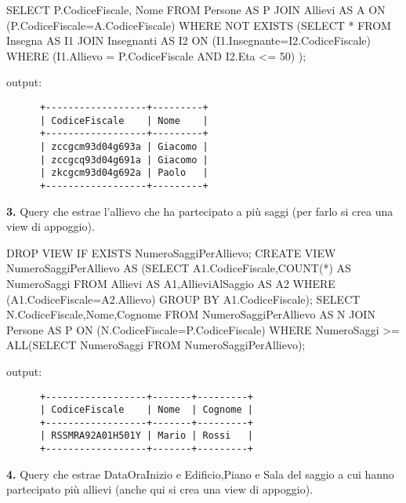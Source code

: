 \documentclass{article}
\begin{document}
\begin{sql}[float=h]
SELECT P.CodiceFiscale, Nome 
FROM Persone AS P JOIN Allievi AS A ON (P.CodiceFiscale=A.CodiceFiscale) 
WHERE NOT EXISTS (SELECT * FROM Insegna AS I1 JOIN Insegnanti AS I2 ON (I1.Insegnante=I2.CodiceFiscale)
		  WHERE (I1.Allievo = P.CodiceFiscale AND I2.Eta <= 50)				
		 );
\end{sql}

\begin{flushleft}
output:
\end{flushleft}

\begin{verbatim}
      +------------------+---------+
      | CodiceFiscale    | Nome    |
      +------------------+---------+
      | zccgcm93d04g693a | Giacomo |
      | zccgcq93d04g691a | Giacomo |
      | zkcgcm93d04g692a | Paolo   |
      +------------------+---------+
\end{verbatim}

\newpage

\begin{flushleft}
\textbf{3.} Query che estrae l'allievo che ha partecipato a più saggi (per farlo si crea una view di appoggio).
\end{flushleft}

\begin{sql}[float=h]
DROP VIEW IF EXISTS NumeroSaggiPerAllievo;
CREATE VIEW NumeroSaggiPerAllievo AS (SELECT A1.CodiceFiscale,COUNT(*) AS NumeroSaggi
				      FROM Allievi AS A1,AllieviAlSaggio AS A2
				      WHERE (A1.CodiceFiscale=A2.Allievo)
				      GROUP BY A1.CodiceFiscale);
SELECT N.CodiceFiscale,Nome,Cognome 
FROM NumeroSaggiPerAllievo AS N JOIN Persone AS P ON (N.CodiceFiscale=P.CodiceFiscale)
WHERE NumeroSaggi >= ALL(SELECT NumeroSaggi FROM NumeroSaggiPerAllievo); 
\end{sql}

\begin{flushleft}
output:
\end{flushleft}

\begin{verbatim}
      +------------------+-------+---------+
      | CodiceFiscale    | Nome  | Cognome |
      +------------------+-------+---------+
      | RSSMRA92A01H501Y | Mario | Rossi   |
      +------------------+-------+---------+
\end{verbatim}

\bigskip

\begin{flushleft}
\textbf{4.} Query che estrae DataOraInizio e Edificio,Piano e Sala del saggio a cui hanno partecipato
più allievi (anche qui si crea una view di appoggio).
\end{flushleft}
\end{document}
